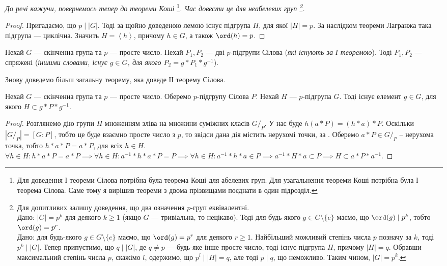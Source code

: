 \documentclass{math_library}
\begin{document}
\textit{До речі кажучи, повернемось тепер до теореми Коші}
\footnote{Для доведення І теореми Сілова потрібна була теорема Коші для абелевих груп. Для узагальнення теореми Коші потрібна була І теорема Сілова. Саме тому я вирішив теореми з двома прізвищами поєднати в один підрозділ.}\textit{. Час довести це для неабелевих груп
\footnote{Для допитливих залишу доведення, що два означення $p$-груп еквівалентні.\\
\rightproof Дано: $|G| = p^k$ для деякого $k \geq 1$ (якщо $G$ --- тривіальна, то нецікаво). Тоді для будь-якого $g \in G \setminus \{e\}$ маємо, що $\ord (g) \mid p^k$, тобто $\ord(g) = p^r$.
\bigskip \\
\leftproof Дано: для будь-якого $g \in G \setminus \{e\}$ маємо, що $\ord (g) = p^r$ для деякого $r \geq 1$. Найбільший можливий степінь числа $p$ позначу за $k$, тоді $p^k \mid |G|$. Тепер припустимо, що $q \mid |G|$, де $q \neq p$ --- будь-яке інше просте число, тоді існує підгрупа $H$, причому $|H| = q$. Обравши максимальний степінь числа $p$, скажімо $l$, одержимо, що $p^l \mid |H| = q$, але тоді $p \mid q$, що неможливо. Таким чином, $|G| = p^k$.
}.
}

\begin{proof}
Пригадаємо, що $p \mid |G|$. Тоді за щойно доведеною лемою існує підгрупа $H$, для якої $|H| = p$. За наслідком теореми Лагранжа така підгрупа --- циклічна. Значить $H = \left<h\right>$, причому $h \in G$, а також $\ord(h) = p$.
\end{proof}

\begin{theorem}
Нехай $G$ --- скінченна група та $p$ --- просте число. Нехай $P_1,P_2$ --- дві $p$-підгрупи Сілова (\textit{які існують за І теоремою}). Тоді $P_1,P_2$ --- спряжені (\textit{іншими словами, існує $g \in G$, для якого $P_2 = g*P_1*g^{-1}$}).
\end{theorem}

Знову доведемо більш загальну теорему, яка доведе ІІ теорему Сілова.

\begin{theorem}
Нехай $G$ --- скінченна група та $p$ --- просте число. Оберемо $p$-підгрупу Сілова $P$. Нехай $H$ --- $p$-підгрупа $G$. Тоді існує елемент $g \in G$, для якого $H \subset g*P*g^{-1}$.
\end{theorem}

\begin{proof}
Розглянемо дію групи $H$ множенням зліва на множини суміжних класів $G/_P$. У нас буде $h (a*P) = (h*a)*P$. Оскільки $|G/_P| = [G:P]$, тобто це буде взаємно просте число з $p$, то звідси дана дія містить нерухомі точки, за . Оберемо $a*P \in G/_P$ -- нерухома точка, тобто $h*a*P = a*P$, для всіх $h \in H$.\\
$\forall h \in H: h*a*P = a*P \implies \forall h \in H: a^{-1}*h*a*P = P \implies \forall h \in H: a^{-1}*h*a \in P \implies a^{-1}*H*a \subset P \implies H \subset a*P*a^{-1}$.
\end{proof}
\end{document}
